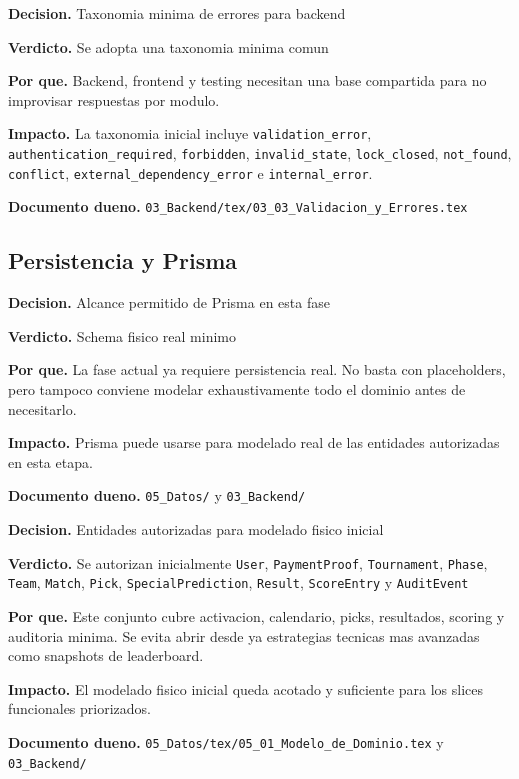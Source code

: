 \begin{docnote}
\textbf{Decision.} Taxonomia minima de errores para backend

\textbf{Verdicto.} Se adopta una taxonomia minima comun

\textbf{Por que.} Backend, frontend y testing necesitan una base compartida para no improvisar respuestas por modulo.

\textbf{Impacto.} La taxonomia inicial incluye \texttt{validation\_error}, \texttt{authentication\_required}, \texttt{forbidden}, \texttt{invalid\_state}, \texttt{lock\_closed}, \texttt{not\_found}, \texttt{conflict}, \texttt{external\_dependency\_error} e \texttt{internal\_error}.

\textbf{Documento dueno.} \texttt{03\_Backend/tex/03\_03\_Validacion\_y\_Errores.tex}
\end{docnote}

\subsection{Persistencia y Prisma}

\begin{docnote}
\textbf{Decision.} Alcance permitido de Prisma en esta fase

\textbf{Verdicto.} Schema fisico real minimo

\textbf{Por que.} La fase actual ya requiere persistencia real. No basta con placeholders, pero tampoco conviene modelar exhaustivamente todo el dominio antes de necesitarlo.

\textbf{Impacto.} Prisma puede usarse para modelado real de las entidades autorizadas en esta etapa.

\textbf{Documento dueno.} \texttt{05\_Datos/} y \texttt{03\_Backend/}
\end{docnote}

\begin{docnote}
\textbf{Decision.} Entidades autorizadas para modelado fisico inicial

\textbf{Verdicto.} Se autorizan inicialmente \texttt{User}, \texttt{PaymentProof}, \texttt{Tournament}, \texttt{Phase}, \texttt{Team}, \texttt{Match}, \texttt{Pick}, \texttt{SpecialPrediction}, \texttt{Result}, \texttt{ScoreEntry} y \texttt{AuditEvent}

\textbf{Por que.} Este conjunto cubre activacion, calendario, picks, resultados, scoring y auditoria minima. Se evita abrir desde ya estrategias tecnicas mas avanzadas como snapshots de leaderboard.

\textbf{Impacto.} El modelado fisico inicial queda acotado y suficiente para los slices funcionales priorizados.

\textbf{Documento dueno.} \texttt{05\_Datos/tex/05\_01\_Modelo\_de\_Dominio.tex} y \texttt{03\_Backend/}
\end{docnote}

